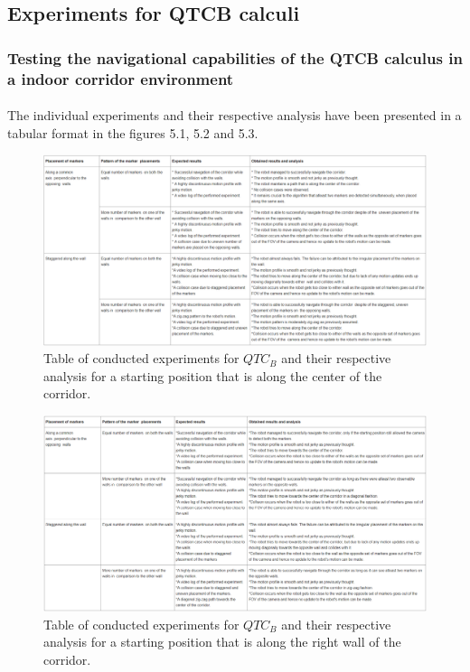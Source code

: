\subsection{Experiments for QTCB calculi}
\subsubsection{Testing the navigational capabilities of the QTCB calculus in a indoor corridor environment} 
\paragraph{}The individual experiments and their respective analysis have been presented in a tabular format in the figures 5.1, 5.2 and 5.3.

\begin{figure}
	\includegraphics[scale = 0.6]{images/center}
	\caption{Table of conducted experiments for $QTC_B$ and their respective analysis for a starting position that is along the center of the corridor.}
	\label{fig:center}
\end{figure}


\begin{figure}
	\includegraphics[scale = 0.6]{"images/right table"}
	\caption{Table of conducted experiments for $QTC_B$ and their respective analysis for a starting position that is along the right wall of the corridor.}
	\label{fig:right-table}
\end{figure}


